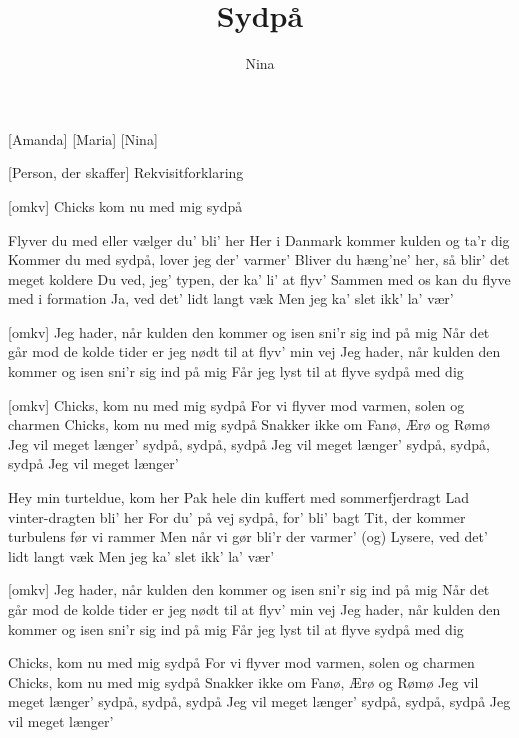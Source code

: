 \documentclass[a4paper,11pt]{article}
\title{Sydpå}
\author{Nina}
\begin{document}
\maketitle

\begin{roles}
    [Amanda]
[Maria]
[Nina]
\end{roles}

\begin{props}
    [Person, der skaffer] Rekvisitforklaring
\end{props}

\begin{song}

  [omkv] Chicks kom nu med mig sydpå

   Flyver du med eller vælger du’ bli’ her
Her i Danmark kommer kulden og ta’r dig
Kommer du med sydpå, lover jeg der’ varmer’
Bliver du hæng’ne’ her, så blir’ det meget koldere
Du ved, jeg' typen, der ka' li' at flyv’
Sammen med os kan du flyve med i formation
Ja, ved det’ lidt langt væk
Men jeg ka' slet ikk' la' vær'

 [omkv] Jeg hader, når kulden den kommer
og isen sni’r sig ind på mig
Når det går mod de kolde tider
er jeg nødt til at flyv’ min vej
Jeg hader, når kulden den kommer
og isen sni’r sig ind på mig
Får jeg lyst til at flyve sydpå med dig

 [omkv] Chicks, kom nu med mig sydpå
For vi flyver mod varmen, solen og charmen
Chicks, kom nu med mig sydpå
Snakker ikke om Fanø, Ærø og Rømø
Jeg vil meget længer’ sydpå, sydpå, sydpå
Jeg vil meget længer’ sydpå, sydpå, sydpå
Jeg vil meget længer’

  Hey min turteldue, kom her
Pak hele din kuffert med sommerfjerdragt
Lad vinter-dragten bli' her
For du' på vej sydpå, for’ bli’ bagt
Tit, der kommer turbulens før vi rammer
Men når vi gør bli'r der varmer'
(og) Lysere, ved det’ lidt langt væk
Men jeg ka' slet ikk' la' vær'


 [omkv] Jeg hader, når kulden den kommer
og isen sni’r sig ind på mig
Når det går mod de kolde tider
er jeg nødt til at flyv’ min vej
Jeg hader, når kulden den kommer
og isen sni’r sig ind på mig
Får jeg lyst til at flyve sydpå med dig

Chicks, kom nu med mig sydpå
For vi flyver mod varmen, solen og charmen
Chicks, kom nu med mig sydpå
Snakker ikke om Fanø, Ærø og Rømø
Jeg vil meget længer’ sydpå, sydpå, sydpå
Jeg vil meget længer’ sydpå, sydpå, sydpå
Jeg vil meget længer’


\end{song}
\end{document}
